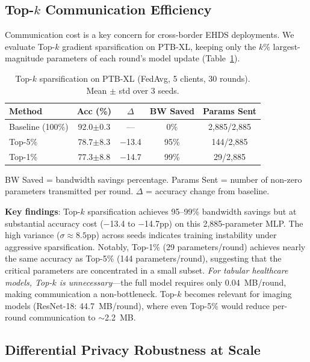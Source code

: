 \documentclass[conference]{IEEEtran}
\begin{document}
\subsection{Top-$k$ Communication Efficiency}
\label{sec:topk_results}

Communication cost is a key concern for cross-border EHDS deployments. We evaluate Top-$k$ gradient sparsification on PTB-XL, keeping only the $k$\% largest-magnitude parameters of each round's model update (Table~\ref{tab:topk_ptbxl}).

\begin{table}[htbp]
\centering
\caption{Top-$k$ sparsification on PTB-XL (FedAvg, 5 clients, 30 rounds). Mean $\pm$ std over 3 seeds.}
\label{tab:topk_ptbxl}
\small
\begin{tabular}{lcccc}
\toprule
\textbf{Method} & \textbf{Acc (\%)} & \textbf{$\Delta$} & \textbf{BW Saved} & \textbf{Params Sent} \\
\midrule
Baseline (100\%) & 92.0{\tiny$\pm$0.3} & --- & 0\% & 2,885/2,885 \\
Top-5\% & 78.7{\tiny$\pm$8.3} & $-$13.4 & 95\% & 144/2,885 \\
Top-1\% & 77.3{\tiny$\pm$8.8} & $-$14.7 & 99\% & 29/2,885 \\
\bottomrule
\end{tabular}

\vspace{1mm}
\footnotesize{BW Saved = bandwidth savings percentage. Params Sent = number of non-zero parameters transmitted per round. $\Delta$ = accuracy change from baseline.}
\end{table}

\textbf{Key findings}: Top-$k$ sparsification achieves 95--99\% bandwidth savings but at substantial accuracy cost ($-$13.4 to $-$14.7pp) on this 2,885-parameter MLP. The high variance ($\sigma \approx 8.5$pp) across seeds indicates training instability under aggressive sparsification. Notably, Top-1\% (29 parameters/round) achieves nearly the same accuracy as Top-5\% (144 parameters/round), suggesting that the critical parameters are concentrated in a small subset. \textit{For tabular healthcare models, Top-$k$ is unnecessary}---the full model requires only 0.04~MB/round, making communication a non-bottleneck. Top-$k$ becomes relevant for imaging models (ResNet-18: 44.7~MB/round), where even Top-5\% would reduce per-round communication to $\sim$2.2~MB.

\subsection{Differential Privacy Robustness at Scale}
\label{sec:dp_at_scale}
\end{document}
